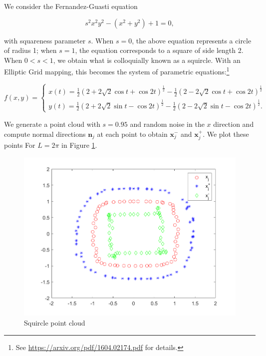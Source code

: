 \begin{solution}
  We consider the Fernandez-Guasti equation

  $$
  s^2 x^2 y^2 - \left( x^2 + y^2 \right) + 1 = 0,
  $$

  with squareness parameter $s$. When $s = 0$, the above equation represents a circle of radius 1; when $s = 1$, the 
  equation corresponds to a square of side length 2. When $0 < s < 1$, we obtain what is colloquially known as a 
  squircle. With an Elliptic Grid mapping, this becomes the system of parametric equations:\footnote{
    See \href{https://arxiv.org/pdf/1604.02174.pdf}{https://arxiv.org/pdf/1604.02174.pdf} for details.
  }

  $$
  f(x, y) = \begin{cases}
    x(t) = \frac{1}{2} \left(2 + 2 \sqrt{2} \cos{t} + \cos{2t}\right)^{\frac{1}{2}} - \frac{1}{2} \left(2 - 2 \sqrt{2} \cos{t} + \cos{2t}\right)^{\frac{1}{2}}\\
    y(t) = \frac{1}{2} \left(2 + 2 \sqrt{2} \sin{t} - \cos{2t}\right)^{\frac{1}{2}} - \frac{1}{2} \left(2 - 2 \sqrt{2} \sin{t} - \cos{2t}\right)^{\frac{1}{2}}.
  \end{cases}
  $$

  \pagebreak
  We generate a point cloud with $s=0.95$ and random noise in the $x$ direction and compute normal directions $\bm{n}_j$ 
  at each point to obtain $\bm{x}^-_j$ and $\bm{x}^+_j$. We plot these points For $L = 2 \pi$ in Figure 
  \ref{fig:problem_1i}.

  \begin{figure}[h]
    \centering
    \includegraphics*[width=\textwidth]{problem_1i.png}
    \caption{Squircle point cloud}
    \label{fig:problem_1i}
  \end{figure}


\end{solution}
